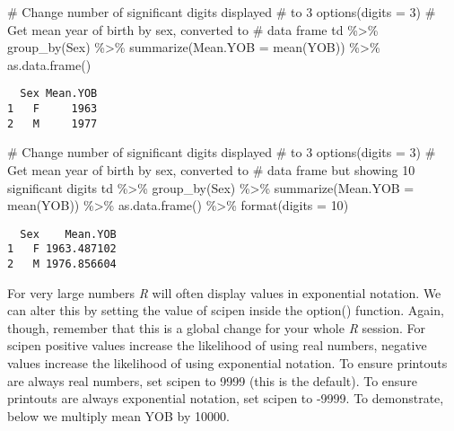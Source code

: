 \documentclass[
  12pt,
  letterpaper]{article}
\newenvironment{Shaded}{\begin{snugshade}}{\end{snugshade}}
\newcommand{\AttributeTok}[1]{\textcolor[rgb]{0.40,0.45,0.13}{#1}}
\newcommand{\CommentTok}[1]{\textcolor[rgb]{0.37,0.37,0.37}{#1}}
\newcommand{\DecValTok}[1]{\textcolor[rgb]{0.68,0.00,0.00}{#1}}
\newcommand{\FunctionTok}[1]{\textcolor[rgb]{0.28,0.35,0.67}{#1}}
\newcommand{\NormalTok}[1]{\textcolor[rgb]{0.00,0.23,0.31}{#1}}
\newcommand{\SpecialCharTok}[1]{\textcolor[rgb]{0.37,0.37,0.37}{#1}}
\renewcommand\texttt[1]{{\ttfamily\color{BrickRed}#1}}
\begin{document}
\begin{Shaded}
\begin{Highlighting}[]
\CommentTok{\# Change number of significant digits displayed}
\CommentTok{\# to 3}
\FunctionTok{options}\NormalTok{(}\AttributeTok{digits =} \DecValTok{3}\NormalTok{)}
\CommentTok{\# Get mean year of birth by sex, converted to}
\CommentTok{\# data frame}
\NormalTok{td }\SpecialCharTok{\%\textgreater{}\%}
    \FunctionTok{group\_by}\NormalTok{(Sex) }\SpecialCharTok{\%\textgreater{}\%}
    \FunctionTok{summarize}\NormalTok{(}\AttributeTok{Mean.YOB =} \FunctionTok{mean}\NormalTok{(YOB)) }\SpecialCharTok{\%\textgreater{}\%}
    \FunctionTok{as.data.frame}\NormalTok{()}
\end{Highlighting}
\end{Shaded}

\begin{verbatim}
  Sex Mean.YOB
1   F     1963
2   M     1977
\end{verbatim}

\begin{Shaded}
\begin{Highlighting}[]
\CommentTok{\# Change number of significant digits displayed}
\CommentTok{\# to 3}
\FunctionTok{options}\NormalTok{(}\AttributeTok{digits =} \DecValTok{3}\NormalTok{)}
\CommentTok{\# Get mean year of birth by sex, converted to}
\CommentTok{\# data frame but showing 10 significant digits}
\NormalTok{td }\SpecialCharTok{\%\textgreater{}\%}
    \FunctionTok{group\_by}\NormalTok{(Sex) }\SpecialCharTok{\%\textgreater{}\%}
    \FunctionTok{summarize}\NormalTok{(}\AttributeTok{Mean.YOB =} \FunctionTok{mean}\NormalTok{(YOB)) }\SpecialCharTok{\%\textgreater{}\%}
    \FunctionTok{as.data.frame}\NormalTok{() }\SpecialCharTok{\%\textgreater{}\%}
    \FunctionTok{format}\NormalTok{(}\AttributeTok{digits =} \DecValTok{10}\NormalTok{)}
\end{Highlighting}
\end{Shaded}

\begin{verbatim}
  Sex    Mean.YOB
1   F 1963.487102
2   M 1976.856604
\end{verbatim}

For very large numbers \emph{R} will often display values in exponential
notation. We can alter this by setting the value of \texttt{scipen}
inside the \texttt{option()} function. Again, though, remember that this
is a global change for your whole \emph{R} session. For \texttt{scipen}
positive values increase the likelihood of using real numbers, negative
values increase the likelihood of using exponential notation. To ensure
printouts are always real numbers, set \texttt{scipen} to 9999 (this is
the default). To ensure printouts are always exponential notation, set
\texttt{scipen} to -9999. To demonstrate, below we multiply mean
\texttt{YOB} by 10000.
\end{document}
